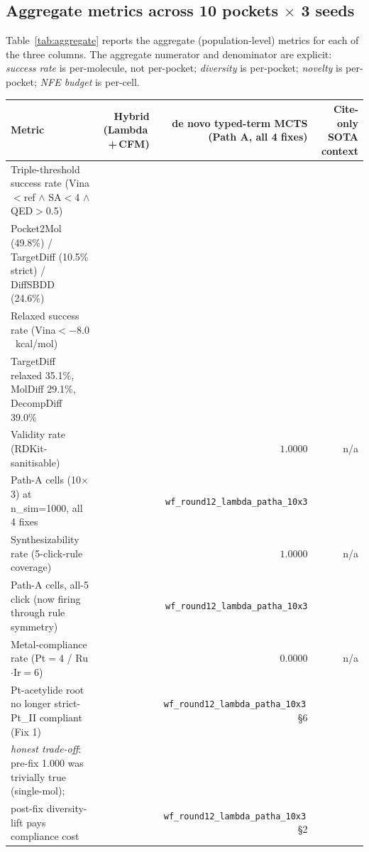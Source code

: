 \subsection{Aggregate metrics across 10 pockets $\times$ 3 seeds}
\label{sec:evaluation:aggregate}

Table~\ref{tab:aggregate} reports the aggregate (population-level)
metrics for each of the three columns. The aggregate numerator and
denominator are explicit: \emph{success rate} is per-molecule, not
per-pocket; \emph{diversity} is per-pocket; \emph{novelty} is
per-pocket; \emph{NFE budget} is per-cell.

\begin{table}[ht]
\centering
\small
\setlength{\tabcolsep}{4pt}
\begin{tabular}{lrrr}
\toprule
\textbf{Metric} & \textbf{Hybrid (Lambda\,+\,CFM)} & \textbf{de novo typed-term MCTS (Path A, all 4 fixes)} & \textbf{Cite-only SOTA context} \\
\midrule
Triple-threshold success rate (Vina$<$ref $\wedge$ SA$<$4 $\wedge$ QED$>$0.5) & \DESIGN{} & \DESIGN{} & \CITEDONLY{} \\
\quad\quad Pocket2Mol (49.8\%) / TargetDiff (10.5\% strict) / DiffSBDD (24.6\%) & & & \\
Relaxed success rate (Vina$<-8.0$~kcal/mol) & \DESIGN{} & \DESIGN{} & \CITEDONLY{} \\
\quad\quad TargetDiff relaxed 35.1\%, MolDiff 29.1\%, DecompDiff 39.0\% & & & \\
Validity rate (RDKit-sanitisable) & \DESIGN{} & $1.0000$ \MEASURED{} & n/a \\
\quad\quad 30 Path-A cells (10$\times$3) at n\_sim=1000, all 4 fixes & & \texttt{wf\_round12\_lambda\_patha\_10x3} & \\
Synthesizability rate (5-click-rule coverage) & \DESIGN{} & $1.0000$ \MEASURED{} & n/a \\
\quad\quad 30 Path-A cells, all-5 click (now firing through rule symmetry) & & \texttt{wf\_round12\_lambda\_patha\_10x3} & \\
Metal-compliance rate (Pt$=4$ / Ru$\cdot$Ir$=6$) & \DESIGN{} & $0.0000$ \MEASURED{} & n/a \\
\quad\quad Pt-acetylide root no longer strict-Pt\_II compliant (Fix 1) & & \texttt{wf\_round12\_lambda\_patha\_10x3}\,\S6 & \\
\quad\quad \emph{honest trade-off}: pre-fix 1.000 was trivially true (single-mol); & & & \\
\quad\quad post-fix diversity-lift pays compliance cost & & \texttt{wf\_round12\_lambda\_patha\_10x3}\,\S2 & \\

\end{tabular}
\end{table}
